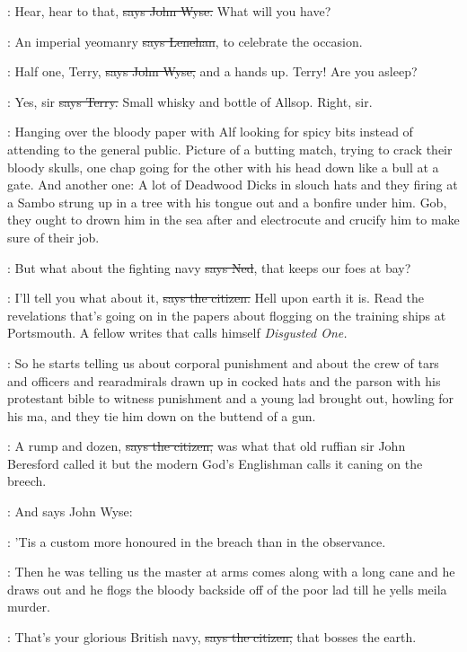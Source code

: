 \johnwyse:
Hear,
hear to that,
\sout{says John Wyse.}
What will you have?

\lenehan:
An imperial yeomanry
\sout{says Lenehan},
to celebrate the occasion.

\johnwyse:
Half one,
Terry,
\sout{says John Wyse,}
and a hands up.
Terry!
Are you asleep?

\terry:
Yes,
sir
\sout{says Terry.}
Small whisky and bottle of Allsop.
Right,
sir.

\Nq:
Hanging over the bloody paper with Alf looking for spicy bits instead
of attending to the general public.
Picture of a butting match,
trying to crack their bloody skulls,
one chap going for the other with his head down
like a bull at a gate.
And another one:
A lot of Deadwood Dicks in slouch hats
and they firing at a Sambo
strung up in a tree with his tongue out and a bonfire under him.
Gob,
they ought to drown him in the sea after
and electrocute and crucify him
to make sure of their job.

\lambert:
But what about the fighting navy
\sout{says Ned},
that keeps our foes at bay?

\citizen:
I'll tell you what about it,
\sout{says the citizen.}
Hell upon earth it is.
Read the revelations that's going on in the papers
about flogging on the training ships at Portsmouth.
A fellow writes that calls himself \emph{Disgusted One.}

\Nq:
So he starts telling us about corporal punishment and about the crew
of tars and officers and rearadmirals drawn up in cocked hats and the
parson with his protestant bible to witness punishment and a young lad brought out,
howling for his ma,
and they tie him down on the buttend of a gun.

\citizen:
A rump and dozen,
\sout{says the citizen,}
was what that old ruffian sir John Beresford called it
but the modern God's Englishman
calls it caning on the breech.%

\Nq:
And says John Wyse:

\johnwyse:
'Tis a custom more honoured in the breach
than in the observance.

\Nq:
Then he was telling us the master at arms
comes along with a long cane
and he draws out
and he flogs the bloody backside off of the poor lad
till he yells meila murder.

\citizen:
That's your glorious British navy,
\sout{says the citizen,}
that bosses the earth.

